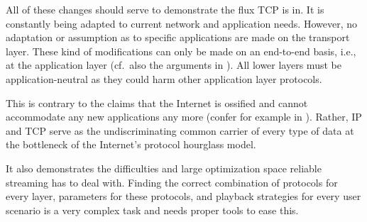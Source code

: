All of these changes should serve to demonstrate the flux \gls{TCP} is in. It is constantly being adapted to current network and application needs. However, no adaptation or assumption as to specific applications are made on the transport layer. These kind of modifications can only be made on an end-to-end basis, i.e., at the application layer (cf.\ also the arguments in \cite{saltzer1984end2end}). All lower layers must be application-neutral as they could harm other application layer protocols.

This is contrary to the claims that the Internet is ossified and cannot accommodate any new applications any more (confer for example in \cite{turner2005diversifying}). Rather, \gls{IP} and \gls{TCP} serve as the undiscriminating common carrier of every type of data at the bottleneck of the Internet's protocol hourglass model.

It also demonstrates the difficulties and large optimization space reliable streaming has to deal with. Finding the correct combination of protocols for every layer, parameters for these protocols, and playback strategies for every user scenario is a very complex task and needs proper tools to ease this.











